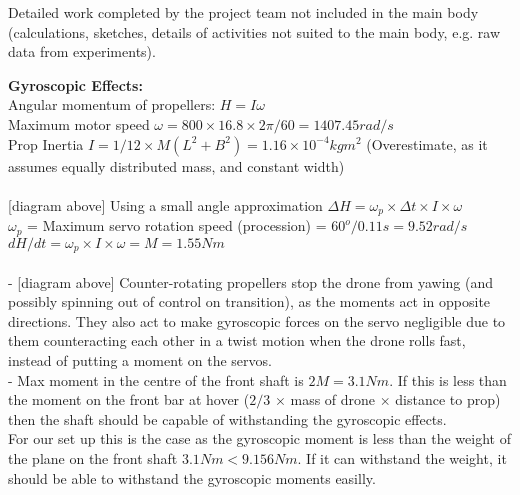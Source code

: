 \label{sec:AppA}
\color{red}
Detailed work completed by the project team not included in the main body (calculations, sketches, details of activities not suited to the main body, e.g. raw data from experiments).
\color{black}

\textbf{Gyroscopic Effects:}\\

Angular momentum of propellers: $H = I\omega$\\
Maximum motor speed $\omega = 800\times16.8\times2\pi/60 = 1407.45rad/s$\\
Prop Inertia $I = 1/12\times M(L^2+B^2) = 1.16\times10^{-4}kgm^2$ (Overestimate, as it assumes equally distributed mass, and constant width)\\\\

[diagram above] Using a small angle approximation $\Delta H = \omega_p \times\Delta t \times I \times \omega$\\ 
$\omega_p$ = Maximum servo rotation speed (procession) = $60^o/0.11s = 9.52rad/s$\\
$dH/dt = \omega_p \times I \times \omega = M = 1.55Nm$\\\\

- [diagram above] Counter-rotating propellers stop the drone from yawing (and possibly spinning out of control on transition), as the moments act in opposite directions. They also act to make gyroscopic forces on the servo negligible due to them counteracting each other in a twist motion when the drone rolls fast, instead of putting a moment on the servos.\\
- Max moment in the centre of the front shaft is $2M = 3.1Nm$. If this is less than the moment on the front bar at hover ($2/3$ $\times $ mass of drone $\times$ distance to prop) then the shaft should be capable of withstanding the gyroscopic effects.\\
For our set up this is the case as the gyroscopic moment is less than the weight of the plane on the front shaft $3.1Nm < 9.156Nm$. If it can withstand the weight, it should be able to withstand the gyroscopic moments easilly.


